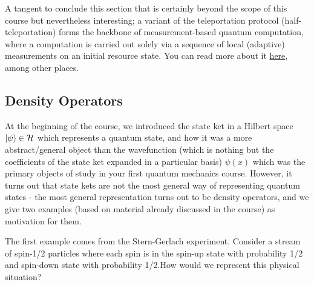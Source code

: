 A tangent to conclude this section that is certainly beyond the scope of this course but nevertheless interesting; a variant of the teleportation protocol (half-teleportation) forms the backbone of measurement-based quantum computation, where a computation is carried out solely via a sequence of local (adaptive) measurements on an initial resource state. You can read more about it \href{https://journals.aps.org/prl/pdf/10.1103/PhysRevLett.86.5188}{here}, among other places.

\subsection{Density Operators}
At the beginning of the course, we introduced the state ket in a Hilbert space $\lvert \psi \rangle \in \mathcal{H}$ which represents a quantum state, and how it was a more abstract/general object than the wavefunction (which is nothing but the coefficients of the state ket expanded in a particular basis) $\psi(x)$ which was the primary objects of study in your first quantum mechanics course. However, it turns out that state kets are not the most general way of representing quantum states - the most general representation turns out to be density operators, and we give two examples (based on material already discussed in the course) as motivation for them.

The first example comes from the Stern-Gerlach experiment. Consider a stream of spin-1/2 particles where each spin is in the spin-up state with probability 1/2 and spin-down state with probability 1/2.How would we represent this physical situation?

